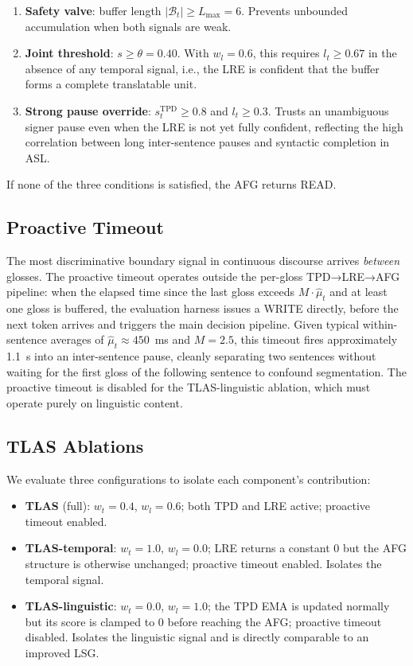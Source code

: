 \documentclass[conference]{IEEEtran}
\begin{document}
\begin{enumerate}
    \item \textbf{Safety valve}: buffer length $|\mathcal{B}_t| \geq L_{\max} = 6$. Prevents unbounded accumulation when both signals are weak.
    \item \textbf{Joint threshold}: $s \geq \theta = 0.40$. With $w_l = 0.6$, this requires $l_t \geq 0.67$ in the absence of any temporal signal, i.e., the LRE is confident that the buffer forms a complete translatable unit.
    \item \textbf{Strong pause override}: $s_t^{\text{TPD}} \geq 0.8$ and $l_t \geq 0.3$. Trusts an unambiguous signer pause even when the LRE is not yet fully confident, reflecting the high correlation between long inter-sentence pauses and syntactic completion in ASL.
\end{enumerate}

If none of the three conditions is satisfied, the AFG returns READ.

\subsection{Proactive Timeout}

The most discriminative boundary signal in continuous discourse arrives \emph{between} glosses. The proactive timeout operates outside the per-gloss TPD→LRE→AFG pipeline: when the elapsed time since the last gloss exceeds $M \cdot \hat{\mu}_t$ and at least one gloss is buffered, the evaluation harness issues a WRITE directly, before the next token arrives and triggers the main decision pipeline. Given typical within-sentence averages of $\hat{\mu}_t \approx 450$~ms and $M = 2.5$, this timeout fires approximately 1.1~s into an inter-sentence pause, cleanly separating two sentences without waiting for the first gloss of the following sentence to confound segmentation. The proactive timeout is disabled for the TLAS-linguistic ablation, which must operate purely on linguistic content.

\subsection{TLAS Ablations}
\label{sec:ablations}

We evaluate three configurations to isolate each component's contribution:

\begin{itemize}
    \item \textbf{TLAS} (full): $w_t = 0.4$, $w_l = 0.6$; both TPD and LRE active; proactive timeout enabled.
    \item \textbf{TLAS-temporal}: $w_t = 1.0$, $w_l = 0.0$; LRE returns a constant 0 but the AFG structure is otherwise unchanged; proactive timeout enabled. Isolates the temporal signal.
    \item \textbf{TLAS-linguistic}: $w_t = 0.0$, $w_l = 1.0$; the TPD EMA is updated normally but its score is clamped to 0 before reaching the AFG; proactive timeout disabled. Isolates the linguistic signal and is directly comparable to an improved LSG.
\end{itemize}
\end{document}
